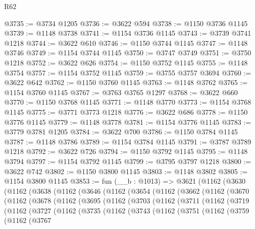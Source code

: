 \begin{lexlean}{R62}
\begin{coremodule}
@3735 := @3734 @1205
@3736 := @3622 @594
@3738 := @1150 @3736 @1145
@3739 := @1148 @3738
@3741 := @1154 @3736 @1145
@3743 := @3739 @3741 @1218
@3744 := @3622 @610
@3746 := @1150 @3744 @1145
@3747 := @1148 @3746
@3749 := @1154 @3744 @1145
@3750 := @3747 @3749
@3751 := @3750 @1218
@3752 := @3622 @626
@3754 := @1150 @3752 @1145
@3755 := @1148 @3754
@3757 := @1154 @3752 @1145
@3759 := @3755 @3757 @3694
@3760 := @3622 @642
@3762 := @1150 @3760 @1145
@3763 := @1148 @3762
@3765 := @1154 @3760 @1145
@3767 := @3763 @3765 @1297
@3768 := @3622 @660
@3770 := @1150 @3768 @1145
@3771 := @1148 @3770
@3773 := @1154 @3768 @1145
@3775 := @3771 @3773 @1218
@3776 := @3622 @686
@3778 := @1150 @3776 @1145
@3779 := @1148 @3778
@3781 := @1154 @3776 @1145
@3783 := @3779 @3781 @1205
@3784 := @3622 @700
@3786 := @1150 @3784 @1145
@3787 := @1148 @3786
@3789 := @1154 @3784 @1145
@3791 := @3787 @3789 @1218
@3792 := @3622 @726
@3794 := @1150 @3792 @1145
@3795 := @1148 @3794
@3797 := @1154 @3792 @1145
@3799 := @3795 @3797 @1218
@3800 := @3622 @742
@3802 := @1150 @3800 @1145
@3803 := @1148 @3802
@3805 := @1154 @3800 @1145
@3853 := fun (__b : @1013) =>
  @3621
    (@1162
      (@3630
        (@1162
          (@3638
            (@1162
              (@3646
                (@1162
                  (@3654
                    (@1162
                      (@3662
                        (@1162
                          (@3670
                            (@1162
                              (@3678
                                (@1162
                                  (@3695
                                    (@1162
                                      (@3703
                                        (@1162
                                          (@3711
                                            (@1162
                                              (@3719
                                                (@1162
                                                  (@3727
                                                    (@1162
                                                      (@3735
                                                        (@1162
                                                          (@3743
                                                            (@1162
                                                              (@3751
                                                                (@1162
                                                                  (@3759
                                                                    (@1162
                                                                      (@3767

\end{coremodule}
\end{lexlean}
